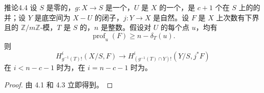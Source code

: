 \begin{SGAresult}{推论}{4.4}
设 $S$ 是零的，$g:X\to S$ 是一个，$U$ 是 $X$ 的一个，是 $c+1$ 个在 $S$ 上的的并；设 $Y$ 是底空间为 $X-U$ 的闭子，$j:Y\to X$ 是自然。设 $F$ 是 $X$ 上次数有下界且的 $\mathbb Z/m\mathbb Z$-模，$T$ 是 $S$ 的，$n$ 是整数。假设对 $U$ 的每个点 $u$，均有
\[
\operatorname{prof}_u(F)\geq n-\delta_T(u).
\]
则
\[
H^i_{g^{-1}(T)!}(X/S,F)\longrightarrow
H^i_{(g^{-1}(T)\cap Y)!}(Y/S,j^*F)
\]
在 $i<n-c-1$ 时为，在 $i=n-c-1$ 时为。
\end{SGAresult}
\begin{proof}
由 4.1 和 4.3 立即得到。
\end{proof}

